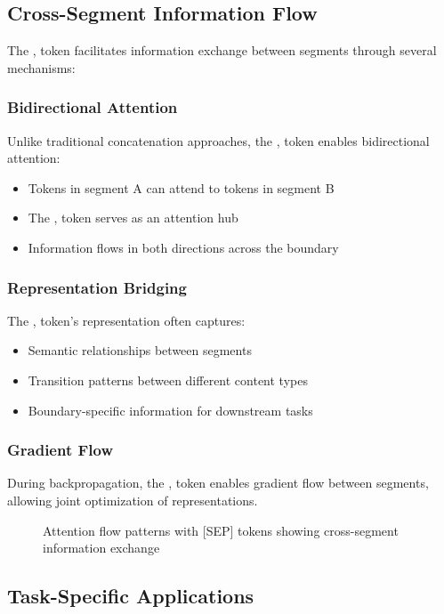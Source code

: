 \subsection{Cross-Segment Information Flow}

The \sep{} token facilitates information exchange between segments through several mechanisms:

\subsubsection{Bidirectional Attention}
Unlike traditional concatenation approaches, the \sep{} token enables bidirectional attention:
\begin{itemize}
\item Tokens in segment A can attend to tokens in segment B
\item The \sep{} token serves as an attention hub
\item Information flows in both directions across the boundary
\end{itemize}

\subsubsection{Representation Bridging}
The \sep{} token's representation often captures:
\begin{itemize}
\item Semantic relationships between segments
\item Transition patterns between different content types
\item Boundary-specific information for downstream tasks
\end{itemize}

\subsubsection{Gradient Flow}
During backpropagation, the \sep{} token enables gradient flow between segments, allowing joint optimization of representations.

\begin{figure}[h]
\centering
% 
\caption{Attention flow patterns with [SEP] tokens showing cross-segment information exchange}
\end{figure}

\subsection{Task-Specific Applications}

